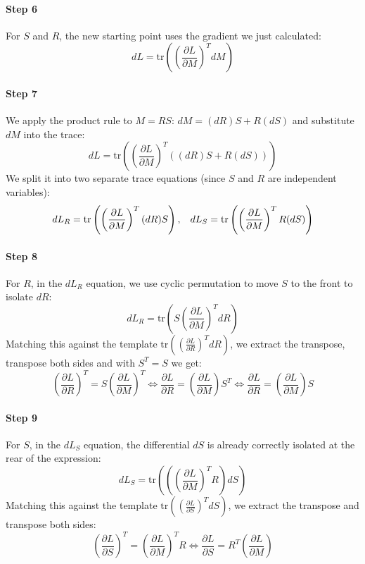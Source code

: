 \paragraph{Step 6} For $S$ and $R$, the new starting point uses the gradient we just calculated:
$$dL = \text{tr}\left( \left(\frac{\partial L}{\partial M}\right)^T dM \right)$$

\paragraph{Step 7} We apply the product rule to $M = R S$: $dM = (dR) S + R (dS)$ and substitute $dM$ into the trace:
$$dL = \text{tr}\left( \left(\frac{\partial L}{\partial M}\right)^T \left( (dR) S + R (dS) \right) \right)$$
We split it into two separate trace equations (since $S$ and $R$ are independent variables):
$$
dL_R = \text{tr}\left( \left(\frac{\partial L}{\partial M}\right)^T (dR) S \right),
\hspace{3mm}
dL_S = \text{tr}\left( \left(\frac{\partial L}{\partial M}\right)^T R (dS) \right)
$$

\paragraph{Step 8} For $R$, in the $dL_R$ equation, we use cyclic permutation to move $S$ to the front to isolate $dR$:
$$dL_R = \text{tr}\left( S \left(\frac{\partial L}{\partial M}\right)^T dR \right)$$
Matching this against the template $\text{tr}\left( \left(\frac{\partial L}{\partial R}\right)^T dR \right)$, we extract the transpose, transpose both sides and with $S^T = S$ we get:
$$
\left(\frac{\partial L}{\partial R}\right)^T = S \left(\frac{\partial L}{\partial M}\right)^T
\Leftrightarrow
\frac{\partial L}{\partial R} = \left(\frac{\partial L}{\partial M}\right) S^T
\Leftrightarrow
\frac{\partial L}{\partial R} = \left(\frac{\partial L}{\partial M}\right) S
$$

\paragraph{Step 9} For $S$, in the $dL_S$ equation, the differential $dS$ is already correctly isolated at the rear of the expression:
$$dL_S = \text{tr}\left( \left( \left(\frac{\partial L}{\partial M}\right)^T R \right) dS \right)$$
Matching this against the template $\text{tr}\left( \left(\frac{\partial L}{\partial S}\right)^T dS \right)$, we extract the transpose and transpose both sides:
$$
\left(\frac{\partial L}{\partial S}\right)^T = \left(\frac{\partial L}{\partial M}\right)^T R
\Leftrightarrow
\frac{\partial L}{\partial S} = R^T \left(\frac{\partial L}{\partial M}\right)
$$

